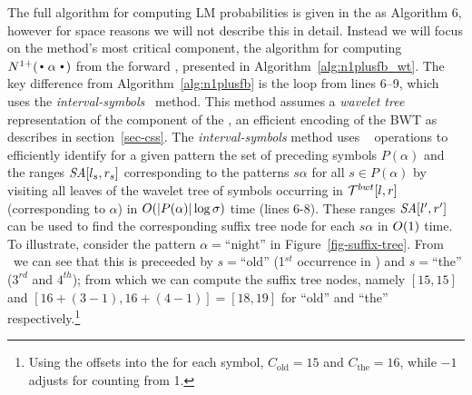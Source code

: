 The full algorithm for computing LM probabilities is given in the \supp as Algorithm 6, however for space reasons we will not describe this in detail.
Instead we will focus on the method's most critical component, the algorithm for computing $\nlplus{\dotpatdot}$ from the forward \CST, presented in Algorithm~\ref{alg:n1plusfb_wt}.
The key difference from Algorithm~\ref{alg:n1plusfb} is the loop from lines 6--9, which uses the \emph{interval-symbols}~\cite{sog-cpm10} method.
This method assumes a \emph{wavelet tree} representation of the \SA component of the \CST, an efficient encoding of the BWT as describes
in section~\ref{sec-css}.
The \emph{interval-symbols} method uses \rankop~ operations to efficiently identify for a given pattern the set of preceding symbols $P(\alpha)$
and the ranges $\mbox{\emph{SA}}[l_s,r_s]$ corresponding to the patterns $s\alpha$ for all $s \in P(\alpha)$ by visiting all leaves of the wavelet tree of symbols occurring in $\mathcal{T}^{bwt}[l,r]$ (corresponding to $\alpha$) in $O(|P(\alpha)|\log\sigma)$ time (lines 6-8).
These ranges $\mbox{\emph{SA}}[l',r']$ can be used to find the corresponding suffix tree node for each $s\alpha$ in $O(1)$ time.
To illustrate, consider the pattern $\alpha=\text{``night''}$ in Figure~\ref{fig-suffix-tree}.
From \colbwt\ we can see that this is preceeded by $s=$``old'' (1$^{st}$ occurrence in \colbwt) and $s=$``the'' ($3^{rd}$ and $4^{th}$);
from which we can compute the suffix tree nodes, namely
$[15,15]$ and $[16+(3-1),16+(4-1)] = [18,19]$ for ``old'' and ``the'' respectively.\footnote{Using the offsets into the \SA for each symbol, $C_{\text{old}} = 15$ and $C_{\text{the}} = 16$, while $-1$ adjusts for counting from 1.}


